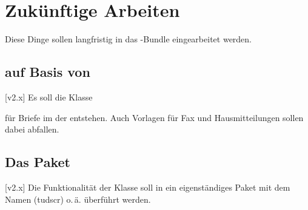 \section{Zukünftige Arbeiten}
Diese Dinge sollen langfristig in das \TUDScript-Bundle eingearbeitet werden.


\subsection*{ auf Basis von }
[v2.x]
Es soll die Klasse
%
\begin{description}
  \item {}
\end{description}
%
für Briefe im \CD der \TnUD entstehen. Auch Vorlagen für Fax und 
Hausmitteilungen sollen dabei abfallen.



\subsection*{Das Paket }
[v2.x]
Die Funktionalität der Klasse  soll in ein eigenständiges 
Paket mit dem Namen (tudscr) o.\,ä. überführt werden.

